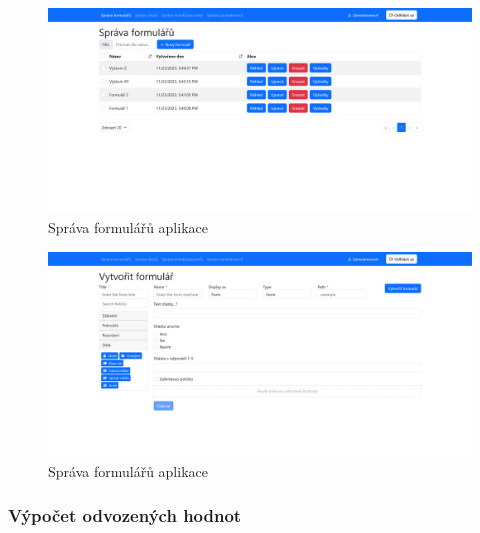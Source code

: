 \begin{figure}[H]
    \centering
    \includegraphics[width=\textwidth]{../img/screenshots/sprava-formularu}
    \caption{Správa formulářů aplikace}\label{fig:sprava-formularu-screenshot}
\end{figure}

\begin{figure}[H]
    \centering
    \includegraphics[width=\textwidth]{../img/screenshots/tvorba-formulare}
    \caption{Správa formulářů aplikace}\label{fig:tvorba-formulare-screenshot}
\end{figure}

\subsubsection{Výpočet odvozených hodnot}\label{subsubsec:vypocet-odvozenych-hodnot}

